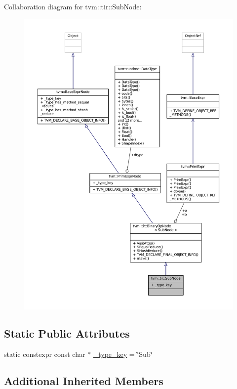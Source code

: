 Collaboration diagram for tvm\+:\+:tir\+:\+:Sub\+Node\+:
\nopagebreak
\begin{figure}[H]
\begin{center}
\leavevmode
\includegraphics[width=350pt]{classtvm_1_1tir_1_1SubNode__coll__graph}
\end{center}
\end{figure}
\subsection*{Static Public Attributes}
\begin{DoxyCompactItemize}
\item 
static constexpr const char $\ast$ \hyperlink{classtvm_1_1tir_1_1SubNode_a0f09c013c78b25f5027cd52787d35264}{\+\_\+type\+\_\+key} = \char`\"{}Sub\char`\"{}
\end{DoxyCompactItemize}
\subsection*{Additional Inherited Members}


